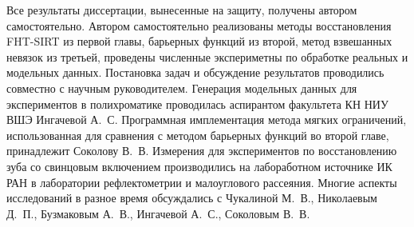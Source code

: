 {\contribution} Все результаты диссертации, вынесенные на защиту, получены автором самостоятельно.
Автором самостоятельно реализованы методы восстановления FHT-SIRT из первой главы, барьерных функций из второй, метод взвешанных невязок из третьей, проведены численные экспериметны по обработке реальных и модельных данных.
Постановка задач и обсуждение результатов проводились совместно с научным руководителем.
Генерация модельных данных для экспериментов в полихроматике проводилась аспирантом факультета КН НИУ ВШЭ Ингачевой А.~С. 
Программная имплементация метода мягких ограничений, использованная для сравнения с методом барьерных функций во второй главе, принадлежит Соколову В.~В.
Измерения для экспериментов по восстановлению зуба со свинцовым включением производились на лабоработном источнике ИК РАН в лаборатории рефлектометрии и малоуглового рассеяния.
Многие аспекты исследований в разное время обсуждались с Чукалиной М.~В., Николаевым Д.~П., Бузмаковым А.~В., Ингачевой А.~С., Соколовым В.~В.


